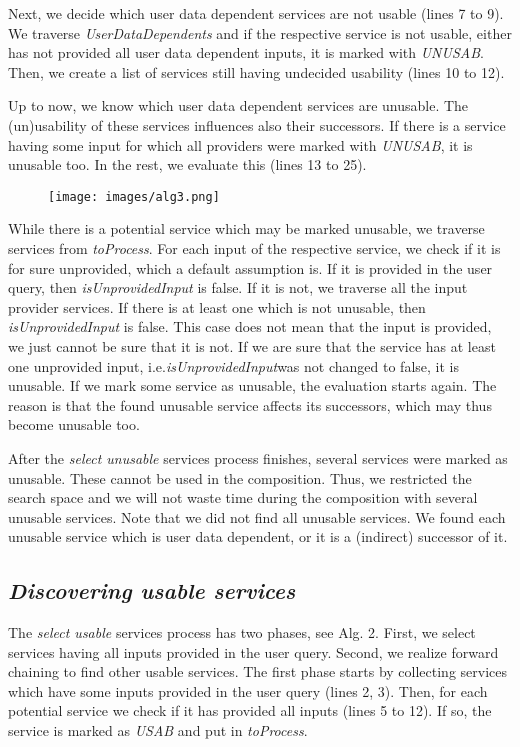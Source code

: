 \documentclass[10pt]{llncs}
\begin{document}
 Next, we decide which user data dependent services are not usable (lines 7 to 9). We traverse \textit{UserDataDependents} and if the respective service is not usable, either has not provided all user data dependent inputs, it is marked with \textit{UNUSAB}. Then, we create a list of services still having undecided usability (lines 10 to 12).

 Up to now, we know which user data dependent services are unusable. The (un)usability of these services inﬂuences also their successors. If there is a service having some input for which all providers were marked with \textit{UNUSAB}, it is unusable too. In the rest, we evaluate this (lines 13 to 25).

\begin{figure}[h]
\texttt{[image: images/alg3.png]}
\end{figure}


While there is a potential service which may be marked unusable, we traverse services from \textit{toProcess}. For each input of the respective service, we check if it is for sure unprovided, which a default assumption is. If it is provided in the user query, then \textit{isUnprovidedInput} is false. If it is not, we traverse all the input provider services. If there is at least one which is not unusable, then \textit{isUnprovidedInput} is false. This case does not mean that the input is provided, we just cannot be sure that it is not. If we are sure that the service has at least one unprovided input, i.e.\textit{isUnprovidedInput}was not changed to false, it is unusable. If we mark some service as unusable, the evaluation starts again. The reason is that the found unusable service affects its successors, which may thus become unusable too.



After the \textit{select unusable} services process ﬁnishes, several services were marked as unusable. These cannot be used in the composition. Thus, we restricted the search space and we will not waste time during the composition with several unusable services. Note that we did not ﬁnd all unusable services. We found each unusable service which is user data dependent, or it is a (indirect) successor of it.

\subsection{\textit{Discovering usable services}}
The \textit{select usable} services process has two phases, see Alg. 2. First, we select services having all inputs provided in the user query. Second, we realize forward chaining to ﬁnd other usable services. The ﬁrst phase starts by collecting services which have some inputs provided in the user query (lines 2, 3). Then, for each potential service we check if it has provided all inputs (lines 5 to 12). If so, the service is marked as \textit{USAB} and put in \textit{toProcess}. 
\end{document}
